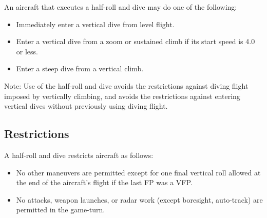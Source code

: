 An aircraft that executes a half-roll and dive may do one of the following:

\begin{itemize}

    \item Immediately enter a vertical dive from level flight.

    \item Enter a vertical dive from a zoom or sustained climb if its start speed is 4.0 or less.

    \item Enter a steep dive from a vertical climb.

\end{itemize}

Note: Use of the half-roll and dive avoids the restrictions against diving flight imposed by vertically climbing, and avoids the restrictions against entering vertical dives without previously using diving flight.

\subsection{Restrictions} A half-roll and dive restricts aircraft as follows:

\begin{itemize}



    \item No other maneuvers are permitted except for one final vertical roll allowed at the end of the aircraft's flight if the last FP was a VFP.

    \item No attacks, weapon launches, or radar work (except boresight, auto-track) are permitted in the game-turn.

\end{itemize}

